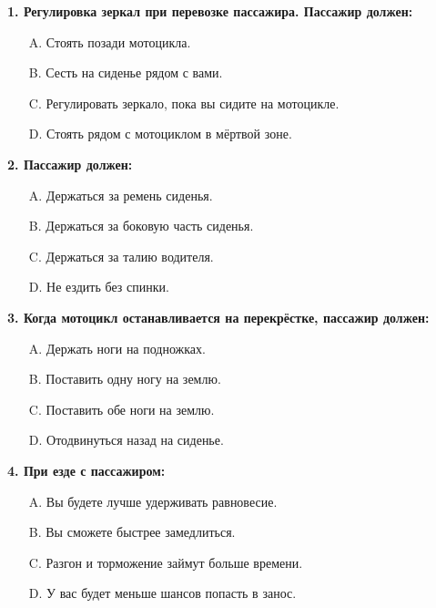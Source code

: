 \begin{minipage}{\linewidth}
\vspace{1em}\noindent\textbf{1. Регулировка зеркал при перевозке пассажира. Пассажир должен:}

\begin{itemize}[nosep,leftmargin=2em]
\item [A.] Стоять позади мотоцикла.
\item [B.] Сесть на сиденье рядом с вами.
\item [C.] Регулировать зеркало, пока вы сидите на мотоцикле.
\item [D.] Стоять рядом с мотоциклом в мёртвой зоне.

\end{itemize}
\end{minipage}


\begin{minipage}{\linewidth}
\vspace{1em}\noindent\textbf{2. Пассажир должен:}

\begin{itemize}[nosep,leftmargin=2em]
\item [A.] Держаться за ремень сиденья.
\item [B.] Держаться за боковую часть сиденья.
\item [C.] Держаться за талию водителя.
\item [D.] Не ездить без спинки.

\end{itemize}
\end{minipage}


\begin{minipage}{\linewidth}
\vspace{1em}\noindent\textbf{3. Когда мотоцикл останавливается на перекрёстке, пассажир должен:}

\begin{itemize}[nosep,leftmargin=2em]
\item [A.] Держать ноги на подножках.
\item [B.] Поставить одну ногу на землю.
\item [C.] Поставить обе ноги на землю.
\item [D.] Отодвинуться назад на сиденье.

\end{itemize}
\end{minipage}


\begin{minipage}{\linewidth}
\vspace{1em}\noindent\textbf{4. При езде с пассажиром:}

\begin{itemize}[nosep,leftmargin=2em]
\item [A.] Вы будете лучше удерживать равновесие.
\item [B.] Вы сможете быстрее замедлиться.
\item [C.] Разгон и торможение займут больше времени.
\item [D.] У вас будет меньше шансов попасть в занос.

\end{itemize}
\end{minipage}


